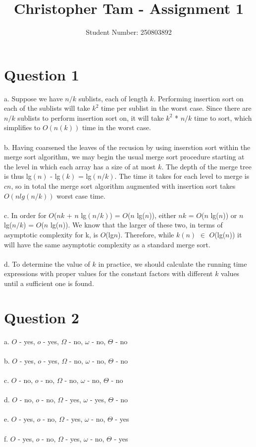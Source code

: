 \documentclass[12pt]{article}
\begin{document}
\title{\Large{\textbf{Christopher Tam - Assignment 1}}}
\author{Student Number: 250803892}
\maketitle

\newpage

\section*{Question 1}
a. Suppose we have $n/k$ sublists, each of length $k$. Performing insertion sort on each of the sublists will take $k^2$ time per sublist in the worst case. Since there are $n/k$ sublists to perform insertion sort on, it will take $k^2$ *  $n/k$ time to sort, which simplifies to $O(n(k))$ time in the worst case. \\\\
b.  Having coarsened the leaves of the recusion by using inserstion sort within the merge sort algorithm, we may begin the usual merge sort procedure starting at the level in which each array has a size of at most $k$. The depth of the merge tree is thus lg$(n)$ -  lg$(k)$ = lg$(n/k)$. The time it takes for each level to merge is $cn$, so in total the merge sort algorithm augmented with insertion sort takes $O(n lg(n/k))$ worst case time. \\\\
c. In order for $O$($nk$ + $n$ lg$(n/k)$) = $O$($n$ lg($n$)), either $nk$ = $O$($n$ lg($n$)) or $n$ lg($n/k$) = $O$($n$ lg($n$)). We know that the larger of these two, in terms of asymptotic complexity for k, is $O$(lg$n$). Therefore, while $k(n)$ $\in$ $O$(lg($n$)) it will have the same asymptotic complexity as a standard merge sort.\\\\
d. To determine the value of $k$ in practice, we should calculate the running time expressions with proper values for the constant factors with different $k$ values until a sufficient one is found.

\section*{Question 2}
a. $O$ - yes, $o$ - yes, $\Omega$ - no, $\omega$ - no,  $\Theta$ - no\\\\
b. $O$ - yes, $o$ - yes, $\Omega$ - no, $\omega$ - no,  $\Theta$ - no\\\\
c. $O$ - no, $o$ - no, $\Omega$ - no, $\omega$ - no,  $\Theta$ - no\\\\
d. $O$ - no, $o$ - no, $\Omega$ - yes, $\omega$ - yes,  $\Theta$ - no\\\\
e. $O$ - yes, $o$ - no, $\Omega$ - yes, $\omega$ - no,  $\Theta$ - yes\\\\
f.  $O$ - yes, $o$ - no, $\Omega$ - yes, $\omega$ - no,  $\Theta$ - yes\\\\
\end{document}
